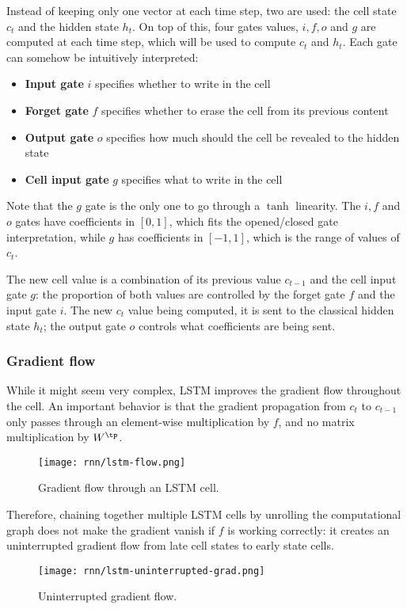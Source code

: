Instead of keeping only one vector at each time step, two are used: the cell state $c_t$ and the hidden state $h_t$. On top of this, four gates values, $i,f,o$ and $g$ are computed at each time step, which will be used to compute $c_t$ and $h_t$. Each gate can somehow be intuitively interpreted:
\begin{itemize}
    \item \textbf{Input gate} $i$ specifies whether to write in the cell
    \item \textbf{Forget gate} $f$ specifies whether to erase the cell from its previous content
    \item \textbf{Output gate} $o$ specifies how much should the cell be revealed to the hidden state
    \item \textbf{Cell input gate} $g$ specifies what to write in the cell
\end{itemize}
Note that the $g$ gate is the only one to go through a $\tanh$ linearity. The $i,f$ and $o$ gates have coefficients in $[0,1]$, which fits the opened/closed gate interpretation, while $g$ has coefficients in $[-1,1]$, which is the range of values of $c_t$.

The new cell value is a combination of its previous value $c_{t-1}$ and the cell input gate $g$: the proportion of both values are controlled by the forget gate $f$ and the input gate $i$. The new $c_t$ value being computed, it is sent to the classical hidden state $h_t$; the output gate $o$ controls what coefficients are being sent.

\subsubsection{Gradient flow}
While it might seem very complex, LSTM improves the gradient flow throughout the cell. An important behavior is that the gradient propagation from $c_t$ to $c_{t-1}$ only passes through an element-wise multiplication by $f$, and no matrix multiplication by $W^\tp$.
\begin{figure}[H]
    \centering
    \texttt{[image: rnn/lstm-flow.png]}
    \caption{Gradient flow through an LSTM cell.}
\end{figure}

Therefore, chaining together multiple LSTM cells by unrolling the computational graph does not make the gradient vanish if $f$ is working correctly: it creates an uninterrupted gradient flow from late cell states to early state cells.
\begin{figure}[H]
    \centering
    \texttt{[image: rnn/lstm-uninterrupted-grad.png]}
    \caption{Uninterrupted gradient flow.}
\end{figure}

